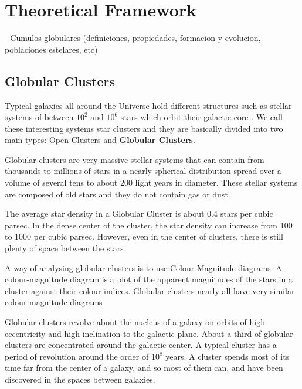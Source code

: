 \chapter{Theoretical Framework}

- Cumulos globulares (definiciones, propiedades, formacion y evolucion, poblaciones estelares, etc)

\section{Globular Clusters}

Typical galaxies all around the Universe hold different structures such as stellar systems of between $ 10^{2} $ and $ 10^{6} $ stars which orbit their galactic core . We call these interesting systems star clusters and they are basically divided into two main types: Open Clusters and \textbf{Globular Clusters}.

Globular clusters are very massive stellar systems that can contain from thousands to millions of stars in a nearly spherical distribution spread over a volume of several tens to about 200 light years in diameter. These stellar systems are composed of old stars and they do not contain gas or dust. 

The average star density in a Globular Cluster is about 0.4 stars per cubic parsec. In the dense center of the cluster, the star density can increase from 100 to 1000 per cubic parsec. However, even in the center of clusters, there is still plenty of space between the stars

A way of analysing globular clusters is to use Colour-Magnitude diagrams. A colour-magnitude diagram is a plot of the apparent magnitudes of the stars in a cluster against their colour indices. Globular clusters nearly all have very similar colour-magnitude diagrams

Globular clusters revolve about the nucleus of a galaxy on orbits of high eccentricity and high inclination to the galactic plane. About a third of globular clusters are concentrated around the galactic center. A typical cluster has a period of revolution around the order of $ 10^{8} $ years. A cluster spends most of its time far from the center of a galaxy, and so most of them can, and have been discovered in the spaces between galaxies.

